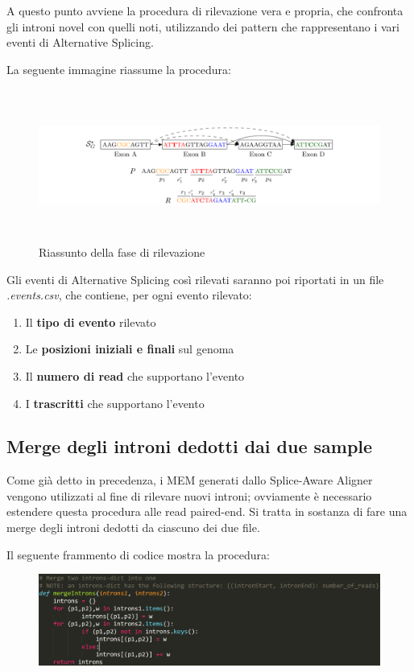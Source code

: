A questo punto avviene la procedura di rilevazione vera e propria, che confronta gli introni novel con quelli noti, utilizzando dei pattern che rappresentano i vari eventi di Alternative Splicing.

La seguente immagine riassume la procedura:

\begin{figure}[h!]
	\centering
	\includegraphics[width=\linewidth, height=5cm]{images/riassuntorilevazione.png}
  \caption{Riassunto della fase di rilevazione}
  \label{fig:Summary2}
\end{figure}

\newpage

Gli eventi di Alternative Splicing così rilevati saranno poi riportati in un file \textit{.events.csv}, che contiene, per ogni evento rilevato:
\begin{enumerate}
	\item Il \textbf{tipo di evento} rilevato
	\item Le \textbf{posizioni iniziali e finali} sul genoma
	\item Il \textbf{numero di read} che supportano l'evento
	\item I \textbf{trascritti} che supportano l'evento
\end{enumerate}

\subsection{Merge degli introni dedotti dai due sample}

Come già detto in precedenza, i MEM generati dallo Splice-Aware Aligner vengono utilizzati al fine di rilevare nuovi introni; ovviamente è necessario estendere questa procedura alle read paired-end. Si tratta in sostanza di fare una merge degli introni dedotti da ciascuno dei due file.

Il seguente frammento di codice mostra la procedura:

\begin{figure}[h!]
	\centering
	\includegraphics[width=\linewidth]{images/mergeIntrons.png}
  \label{fig:MergeIntrons}
\end{figure}

